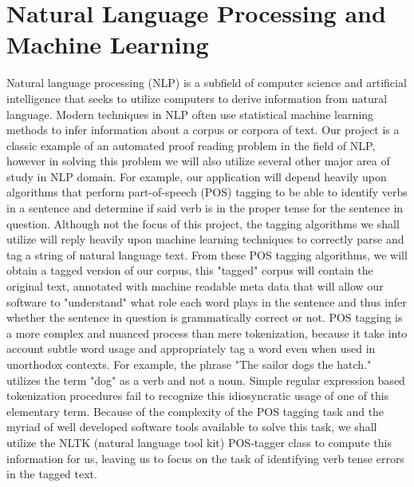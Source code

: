 \documentclass{article}
\begin{document}
\section{Natural Language Processing and Machine Learning }
Natural language processing (NLP) is a subfield of computer science and artificial intelligence that seeks to utilize computers to derive information from natural language. Modern techniques in NLP often use statistical machine learning methods to infer information about a corpus or corpora of text. Our project is a classic example of an automated proof reading problem in the field of NLP, however in solving this problem we will also utilize several other major area of study in NLP domain. For example, our application will depend heavily upon algorithms that perform part-of-speech (POS) tagging to be able to identify verbs in a sentence and determine if said verb is in the proper tense for the sentence in question. Although not the focus of this project, the tagging algorithms we shall utilize will reply heavily upon machine learning techniques \citep{NLPML} to correctly parse and tag a string of natural language text. From these POS tagging algorithms, we will obtain a tagged version of our corpus, this "tagged" corpus will contain the original text, annotated with machine readable meta data that will allow our software to "understand" what role each word plays in the sentence and thus infer whether the sentence in question is grammatically correct or not. POS tagging is a more complex and nuanced process than mere tokenization, because it take into account subtle word usage and appropriately tag a word even when used in unorthodox contexts. For example, the phrase "The sailor dogs the hatch." utilizes the term "dog" as a verb and not a noun. Simple regular expression based tokenization procedures fail to recognize this idiosyncratic usage of one of this elementary term. Because of the complexity of the POS tagging task and the myriad of well developed software tools available to solve this task, we shall utilize the NLTK (natural language tool kit) POS-tagger class to compute this information for us, leaving us to focus on the task of identifying verb tense errors in the tagged text. 
\end{document}
